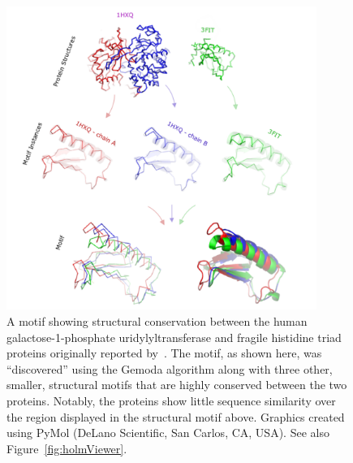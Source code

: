     \begin{figure}[ptb]
        \centering
        \includegraphics[width=0.90\textwidth]{Body/Images-chap3/gemoda_fig4.pdf}
        \caption[A motif showing structural conservation between
        the human galactose-1-phosphate uridylyltransferase and
        fragile histidine triad proteins originally reported
        by~\citet{holm1997enzyme}]{A motif showing structural conservation between
        the human galactose-1-phosphate uridylyltransferase and
        fragile histidine triad proteins originally reported
        by~\citet{holm1997enzyme}.
        The motif, as shown here, was ``discovered''
        using the Gemoda algorithm along with three other, smaller,
        structural motifs that are highly conserved between the
        two proteins.  Notably, the proteins show little sequence
        similarity over the region displayed in the structural
        motif above.  Graphics created using PyMol (DeLano Scientific,
        San Carlos, CA, USA).  See also Figure~\vref{fig:holmViewer}.}\label{fig:holm}
    \end{figure}

